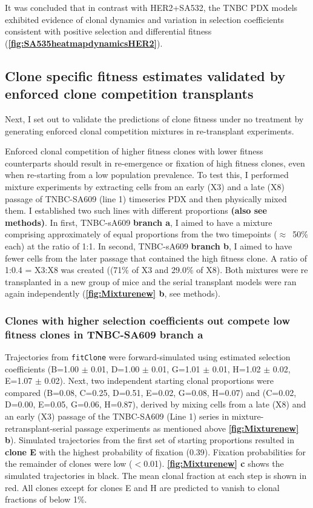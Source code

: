 It was concluded that in contrast with HER2+SA532, the TNBC PDX models exhibited evidence of clonal dynamics and variation in selection coefficients consistent with positive selection and differential fitness (\textbf{\autoref{fig:SA535heatmapdynamicsHER2}}). 


\subsection{Clone specific fitness estimates validated by enforced clone competition transplants} 
Next, I set out to validate the predictions of clone fitness under no treatment by generating enforced clonal competition mixtures in re-transplant experiments.

Enforced clonal competition of higher fitness clones with lower fitness counterparts should result in re-emergence or fixation of high fitness clones, even when re-starting from a low population prevalence. To test this, I performed mixture experiments by extracting cells from an early (X3) and a late (X8) passage of TNBC-SA609 (line 1) timeseries PDX and then physically mixed them. I established two such lines with different proportions \textbf{(also see methods)}.
In first, TNBC-sA609 \textbf{branch a}, I aimed to have a mixture comprising approximately of equal proportions from the two timepoints ($\approx$~50\% each) at the ratio of 1:1. In second, TNBC-sA609 \textbf{branch b}, I aimed to have fewer cells from the later passage that contained the high fitness clone. A ratio of 1:0.4 = X3:X8 was created ((71\% of X3 and 29.0\% of X8). 
Both mixtures were re transplanted in a new group of mice and the serial transplant models were ran again independently (\textbf{\autoref{fig:Mixturenew} b}, see methods).

\subsubsection{Clones with higher selection coefficients out compete low fitness clones in TNBC-SA609 branch a}
 Trajectories from \texttt{fitClone} were forward-simulated using estimated selection coefficients (B=1.00 $\pm$ 0.01, D=1.00 $\pm$ 0.01, G=1.01 $\pm$ 0.01, H=1.02 $\pm$ 0.02, E=1.07 $\pm$ 0.02). Next, two independent starting clonal proportions were compared (B=0.08, C=0.25, D=0.51, E=0.02, G=0.08, H=0.07) and (C=0.02, D=0.00, E=0.05, G=0.06, H=0.87), derived by mixing cells from a late (X8) and an early (X3) passage of the TNBC-SA609 (Line 1) series in mixture-retransplant-serial passage experiments as mentioned above \textbf{\autoref{fig:Mixturenew} b}). Simulated trajectories from the first set of starting proportions resulted in \textbf{clone E} with the highest probability of fixation (0.39). Fixation probabilities for the remainder of clones were low ($<$0.01). \textbf{\autoref{fig:Mixturenew} c} shows the simulated trajectories in black.
The mean clonal fraction at each step is shown in red. All clones except for clones E and H are predicted to vanish to clonal fractions of below 1\%. 

